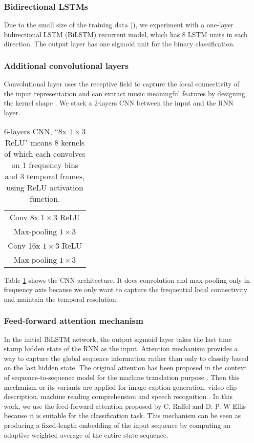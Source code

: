 \subsubsection{Bidirectional LSTMs}\label{sec:ch6:bilstm}

Due to the small size of the training data (), we experiment with a one-layer bidirectional LSTM (BiLSTM) recurrent model, which has 8 LSTM units in each direction. The output layer has one sigmoid unit for the binary classification.

\subsubsection{Additional convolutional layers}

Convolutional layer uses the receptive field to capture the local connectivity of the input representation and can extract music meaningful features by designing the kernel shape \cite{Pons2017Timbre}. We stack a 2-layers CNN between the input and the RNN layer.

\begin{table}[ht!]
\centering
\caption{6-layers CNN,  ``8x $1\times3$ ReLU" means 8 kernels of which each convolves on 1 frequency bins and 3 temporal frames, using ReLU activation function.}
\label{tab:ch6:cnn_mispronunciation}
\begin{tabular}{c}
\toprule
Conv 8x $1{\times}3$ ReLU\\
Max-pooling $1{\times}3$ \\
Conv 16x $1{\times}3$ ReLU\\
Max-pooling $1{\times}3$ \\
\bottomrule
\end{tabular}
\end{table}

Table \ref{tab:ch6:cnn_mispronunciation} shows the CNN architecture. It does convolution and max-pooling only in frequency axis because we only want to capture the frequential local connectivity and maintain the temporal resolution. 

\subsubsection{Feed-forward attention mechanism}\label{sec:ch6:feed_forward_att}

In the initial BiLSTM network, the output sigmoid layer takes the last time stamp hidden state of the RNN as the input. Attention mechanism provides a way to capture the global sequence information rather than only to classify based on the last hidden state. The original attention has been proposed in the context of sequence-to-sequence model for the machine translation purpose \cite{Bahdanau2014}. Then this mechanism or its variants are applied for image caption generation, video clip description, machine reading comprehension and speech recognition \cite{Cho2015,Xu2015,Hermann2015}. In this work, we use the feed-forward attention proposed by C. Raffel and D. P. W Ellis \cite{Raffel2015} because it is suitable for the classification task. This mechanism can be seen as producing a fixed-length embedding of the input sequence by computing an adaptive
weighted average of the entire state sequence.

